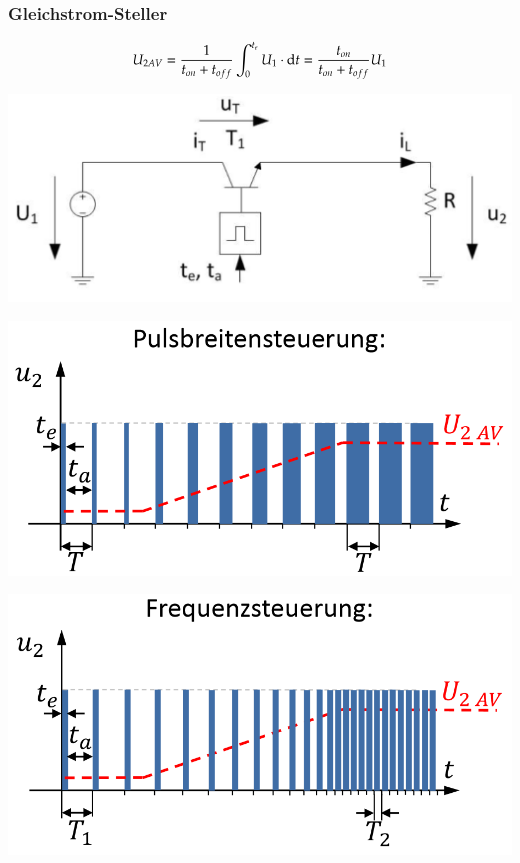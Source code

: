 \subsubsection{Gleichstrom-Steller}
\begin{minipage}{0.5\linewidth}
\[ U_{2AV}=\frac{1}{t_{on}+t_{off}}\int_{0}^{t_e}U_1\cdot \mathop{}\!\mathrm{d} t = \frac{t_{on}}{t_{on}+t_{off}}U_1 \]
\end{minipage}
\begin{minipage}{0.4\linewidth}
\includegraphics[width=1.2\linewidth]{images/GsSteller}
\end{minipage}

\begin{minipage}{0.5\linewidth}
    \includegraphics[width=0.8\linewidth]{images/GsStellerPuls}
\end{minipage}
\begin{minipage}{0.5\linewidth}
    \includegraphics[width=0.8\linewidth]{images/GsStellerFreq}
\end{minipage}

